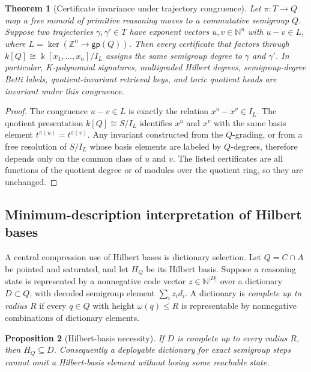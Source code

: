 \documentclass[11pt]{article}
\newtheorem{theorem}{Theorem}[section]
\newtheorem{proposition}[theorem]{Proposition}
\theoremstyle{definition}
\newcommand{\NN}{\mathbb{N}}
\newcommand{\ZZ}{\mathbb{Z}}
\begin{document}
\begin{theorem}[Certificate invariance under trajectory congruence]
Let \(\pi:T\to Q\) map a free monoid of primitive reasoning moves to a commutative semigroup \(Q\).  Suppose two trajectories \(\gamma,\gamma'\in T\) have exponent vectors \(u,v\in\NN^n\) with \(u-v\in L\), where \(L=\ker(\ZZ^n\to \mathsf{gp}(Q))\).  Then every certificate that factors through \(k[Q]\cong \Bbbk[x_1,\ldots,x_n]/I_L\) assigns the same semigroup degree to \(\gamma\) and \(\gamma'\).  In particular, K-polynomial signatures, multigraded Hilbert degrees, semigroup-degree Betti labels, quotient-invariant retrieval keys, and toric quotient heads are invariant under this congruence.
\end{theorem}

\begin{proof}
The congruence \(u-v\in L\) is exactly the relation \(x^u-x^v\in I_L\).  The quotient presentation \(k[Q]\cong S/I_L\) identifies \(x^u\) and \(x^v\) with the same basis element \(t^{\pi(u)}=t^{\pi(v)}\).  Any invariant constructed from the \(Q\)-grading, or from a free resolution of \(S/I_L\) whose basis elements are labeled by \(Q\)-degrees, therefore depends only on the common class of \(u\) and \(v\).  The listed certificates are all functions of the quotient degree or of modules over the quotient ring, so they are unchanged.
\end{proof}

\subsection{Minimum-description interpretation of Hilbert bases}
A central compression use of Hilbert bases is dictionary selection.  Let \(Q=C\cap A\) be pointed and saturated, and let \(H_Q\) be its Hilbert basis.  Suppose a reasoning state is represented by a nonnegative code vector \(z\in\NN^{|D|}\) over a dictionary \(D\subset Q\), with decoded semigroup element \(\sum_i z_i d_i\).  A dictionary is \emph{complete up to radius \(R\)} if every \(q\in Q\) with height \(\omega(q)\le R\) is representable by nonnegative combinations of dictionary elements.

\begin{proposition}[Hilbert-basis necessity]
If \(D\) is complete up to every radius \(R\), then \(H_Q\subseteq D\).  Consequently a deployable dictionary for exact semigroup steps cannot omit a Hilbert-basis element without losing some reachable state.
\end{proposition}
\end{document}
